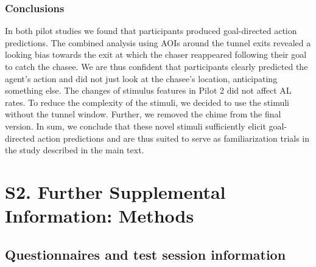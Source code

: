 \documentclass[
  english,
  man, donotrepeattitle,floatsintext]{apa6}
\begin{document}
\hypertarget{conclusions}{%
\subsubsection{Conclusions}\label{conclusions}}

In both pilot studies we found that participants produced goal-directed action predictions. The combined analysis using AOIs around the tunnel exits revealed a looking bias towards the exit at which the chaser reappeared following their goal to catch the chasee. We are thus confident that participants clearly predicted the agent's action and did not just look at the chasee's location, anticipating something else. The changes of stimulus features in Pilot 2 did not affect AL rates. To reduce the complexity of the stimuli, we decided to use the stimuli without the tunnel window. Further, we removed the chime from the final version. In sum, we conclude that these novel stimuli sufficiently elicit goal-directed action predictions and are thus suited to serve as familiarization trials in the study described in the main text.

\hypertarget{s2.-further-supplemental-information-methods}{%
\section{S2. Further Supplemental Information: Methods}\label{s2.-further-supplemental-information-methods}}

\hypertarget{questionnaires-and-test-session-information}{%
\subsection{Questionnaires and test session information}\label{questionnaires-and-test-session-information}}
\end{document}
